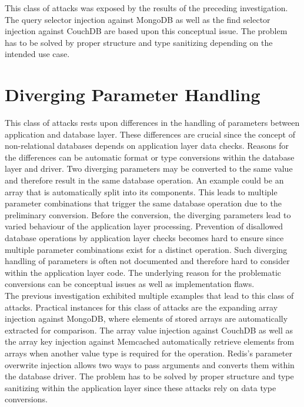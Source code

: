 This class of attacks was exposed by the results of the preceding investigation. The query selector injection against MongoDB as well as the find selector injection against CouchDB are based upon this conceptual issue. The problem has to be solved by proper structure and type sanitizing depending on the intended use case.

\section{Diverging Parameter Handling}
This class of attacks rests upon differences in the handling of parameters between application and database layer. These differences are crucial since the concept of non-relational databases depends on application layer data checks. Reasons for the differences can be automatic format or type conversions within the database layer and driver. Two diverging parameters may be converted to the same value and therefore result in the same database operation. An example could be an array that is automatically split into its components. This leads to multiple parameter combinations that trigger the same database operation due to the preliminary conversion. Before the conversion, the diverging parameters lead to varied behaviour of the application layer processing. Prevention of disallowed database operations by application layer checks becomes hard to ensure since multiple parameter combinations exist for a distinct operation. Such diverging handling of parameters is often not documented and therefore hard to consider within the application layer code. The underlying reason for the problematic conversions can be conceptual issues as well as implementation flaws.\\

The previous investigation exhibited multiple examples that lead to this class of attacks. Practical instances for this class of attacks are the expanding array injection against MongoDB, where elements of stored arrays are automatically extracted for comparison. The array value injection against CouchDB as well as the array key injection against Memcached automatically retrieve elements from arrays when another value type is required for the operation. Redis's parameter overwrite injection allows two ways to pass arguments and converts them within the database driver. The problem has to be solved by proper structure and type sanitizing within the application layer since these attacks rely on data type conversions.

